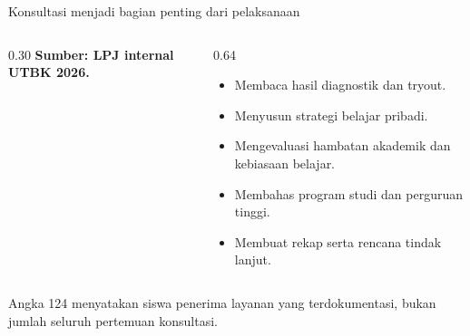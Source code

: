 \begin{frame}{Konsultasi menjadi bagian penting dari pelaksanaan}
  \begin{columns}[T,onlytextwidth]
    \begin{column}{0.30\textwidth}
      \vspace{0.16cm}
      {\color{StudentGreen}\bfseries\fontsize{10.5}{13}\selectfont Sumber: LPJ internal UTBK 2026.}
    \end{column}
    \begin{column}{0.64\textwidth}
      \begin{itemize}
        \item Membaca hasil diagnostik dan tryout.
        \item Menyusun strategi belajar pribadi.
        \item Mengevaluasi hambatan akademik dan kebiasaan belajar.
        \item Membahas program studi dan perguruan tinggi.
        \item Membuat rekap serta rencana tindak lanjut.
      \end{itemize}
    \end{column}
  \end{columns}
  \vspace{0.12cm}
  {\color{StudentGray}\fontsize{9.5}{11.8}\selectfont Angka 124 menyatakan siswa penerima layanan yang terdokumentasi, bukan jumlah seluruh pertemuan konsultasi.}
\end{frame}

